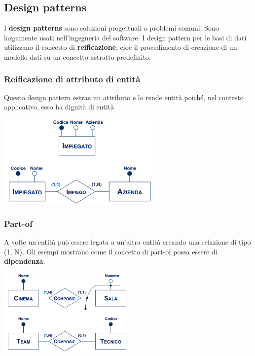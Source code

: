 \documentclass[12pt]{article}
\begin{document}
\subsection{Design patterns}
I \textbf{design patterns} sono soluzioni progettuali a problemi comuni.
Sono largamente usati nell'ingegneria del software.
I design pattern per le basi di dati utilizzano il concetto di \textbf{reificazione}, cioè il procedimento di creazione di un modello dati su un concetto astratto predefinito.
\subsubsection{Reificazione di attributo di entità}
Questo design pattern estrae un attributo e lo rende entità poiché, nel contesto applicativo, esso ha dignità di entità
\begin{center}
    \includegraphics[width = 0.60\textwidth]{Images/45.PNG}
\end{center}
\subsubsection{Part-of}
A volte un'entità può essere legata a un'altra entità creando una relazione di tipo (1, N). Gli esempi
mostrano come il concetto di part-of possa essere di \textbf{dipendenza}.
\begin{center}
    \includegraphics[width = 0.50\textwidth]{Images/46.PNG}
\end{center}
\end{document}
